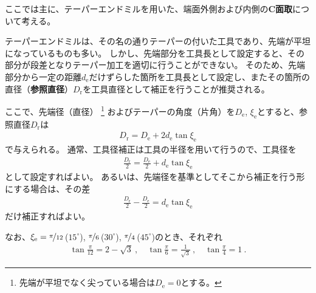 


ここでは主に、テーパーエンドミルを用いた、端面外側および内側の\textbf{C面取}について考える。


テーパーエンドミルは、その名の通りテーパーの付いた工具であり、先端が平坦になっているものも多い。
しかし、先端部分を工具長として設定すると、その部分が段差となりテーパー加工を適切に行うことができない。
そのため、先端部分から一定の距離$d_\mathrm e$だけずらした箇所を工具長として設定し、またその箇所の直径（\textbf{参照直径}）$D_\mathrm r$を工具直径として補正を行うことが推奨される。

ここで、先端径（直径）
\footnote{先端が平坦でなく尖っている場合は$D_\mathrm e = 0$とする。}
およびテーパーの角度（片角）を$D_\mathrm e$, $\xi_\mathrm e$とすると、参照直径$D_\mathrm r$は
\begin{align*}
  D_\mathrm r = D_\mathrm e+2d_\mathrm e\tan\xi_\mathrm e
\end{align*}
で与えられる。
通常、工具径補正は工具の半径を用いて行うので、工具径を
\begin{align*}
  \frac{D_\mathrm r}2 = \frac{D_\mathrm e}2+d_\mathrm e\tan\xi_\mathrm e
\end{align*}
として設定すればよい。
あるいは、先端径を基準としてそこから補正を行う形にする場合は、その差
\begin{align*}
  \frac{D_\mathrm r}2-\frac{D_\mathrm e}2 = d_\mathrm e\tan\xi_\mathrm e
\end{align*}
だけ補正すればよい。
\begin{hosoku}
なお、$\xi_\mathrm e = \nicefrac\pi{12}$\,($15^\circ$), $\nicefrac\pi6$\,($30^\circ$), $\nicefrac\pi4$\,($45^\circ$)のとき、それぞれ
\begin{align*}
  \tan\frac\pi{12} = 2-\sqrt3\ , \quad
  \tan\frac\pi6 = \frac1{\sqrt3}\ , \quad
  \tan\frac\pi4 = 1\ .
\end{align*}
\end{hosoku}\relax


